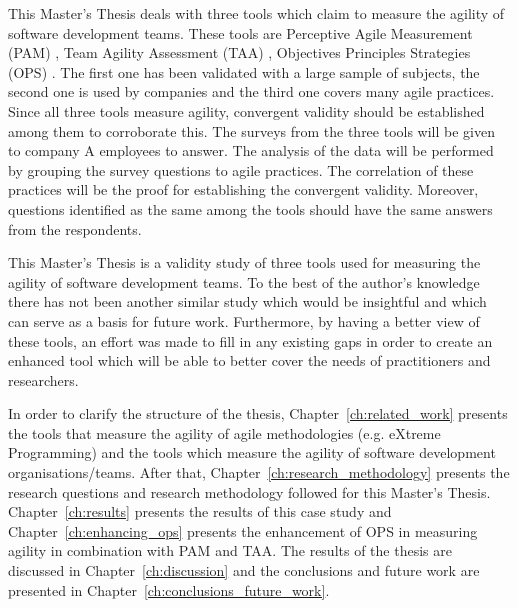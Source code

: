 This Master's Thesis deals with three tools which claim to measure the agility of software development teams. These tools are Perceptive Agile Measurement (PAM) \cite{pam}, Team Agility Assessment (TAA) \cite{Leffingwell}, Objectives Principles Strategies (OPS) \cite{sventha_dissertation}. The first one has been validated with a large sample of subjects, the second one is used by companies and the third one covers many agile practices. Since all three tools measure agility, convergent validity should be established among them to corroborate this. The surveys from the three tools will be given to company A employees to answer. The analysis of the data will be performed by grouping the survey questions to agile practices. The correlation of these practices will be the proof for establishing the convergent validity. Moreover, questions identified as the same among the tools should have the same answers from the respondents.

This Master's Thesis is a validity study of three tools used for measuring the agility of software development teams. To the best of the author's knowledge there has not been another similar study which would be insightful and which can serve as a basis for future work. Furthermore, by having a better view of these tools, an effort was made to fill in any existing gaps in order to create an enhanced tool which will be able to better cover the needs of practitioners and researchers. 

In order to clarify the structure of the thesis,  Chapter~\ref{ch:related_work} presents the tools that measure the agility of agile methodologies (e.g. eXtreme Programming) and the tools which measure the agility of software development organisations/teams. After that, Chapter~\ref{ch:research_methodology} presents the research questions and research methodology followed for this Master's Thesis. Chapter~\ref{ch:results} presents the results of this case study and Chapter~\ref{ch:enhancing_ops} presents the enhancement of \ac{OPS} in measuring agility in combination with \ac{PAM} and \ac{TAA}. The results of the thesis are discussed in Chapter~\ref{ch:discussion} and the conclusions and future work are presented in Chapter~\ref{ch:conclusions_future_work}.  